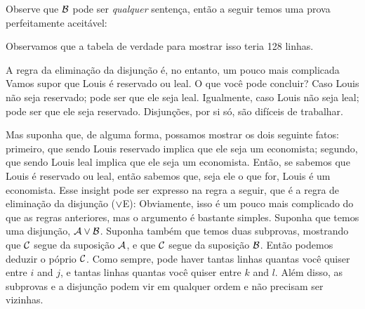  

Observe que $\mathcal{B}$ pode ser \emph{qualquer} senten\c ca, ent\~ao a seguir temos uma prova perfeitamente aceit\' avel: 
\begin{fitchproof}
\end{fitchproof}


Observamos que a tabela de verdade para mostrar isso teria 128 linhas.

A regra da elimina\c c\~ao da disjun\c c\~ao \'e, no entanto, um pouco mais complicada Vamos supor que  Louis \'e reservado ou leal.  O que voc\^e pode concluir? Caso  Louis  n\~ao seja reservado; pode ser que ele seja leal.   Igualmente, caso  Louis  n\~ao seja leal; pode ser que ele seja reservado.  Disjun\c c\~oes, por si s\'o, s\~ao dif\'iceis de trabalhar.

Mas suponha que, de alguma forma, possamos mostrar os dois seguinte fatos: primeiro, que sendo Louis reservado implica que ele seja um economista; segundo, que sendo Louis leal implica que ele seja um economista.
Ent\~ao, se sabemos que Louis \'e reservado ou leal, ent\~ao sabemos que, seja ele o que for, Louis \'e um economista.   Esse insight pode ser expresso na regra a seguir, que \'e a regra de elimina\c c\~ao da disjun\c c\~ao  ($\vee$E):
Obviamente, isso \'e um pouco mais complicado do que as regras anteriores, mas o argumento \'e bastante simples. Suponha que temos uma disjun\c c\~ao, $\mathcal{A} \vee \mathcal{B}$. Suponha tamb\'em que temos duas subprovas, mostrando que $\mathcal{C}$ segue da suposi\c c\~ao $\mathcal{A}$, e que $\mathcal{C}$ segue da suposi\c c\~ao $\mathcal{B}$. Ent\~ao podemos deduzir o p\'oprio $\mathcal{C}$. 
 Como sempre, pode haver  tantas linhas quantas  voc\^e quiser entre   $i$ and $j$,   e tantas linhas quantas voc\^e quiser entre $k$ and $l$. Al\'em disso, as subprovas e a disjun\c c\~ao podem vir em qualquer ordem e n\~ao precisam ser vizinhas.


